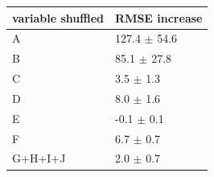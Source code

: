 \begin{tabular}{ll}
\toprule
variable shuffled & RMSE increase \\
\midrule
A & 127.4 $\pm$ 54.6 \\
B & 85.1 $\pm$ 27.8 \\
C & 3.5 $\pm$ 1.3 \\
D & 8.0 $\pm$ 1.6 \\
E & -0.1 $\pm$ 0.1 \\
F & 6.7 $\pm$ 0.7 \\
G+H+I+J & 2.0 $\pm$ 0.7 \\
\bottomrule
\end{tabular}
